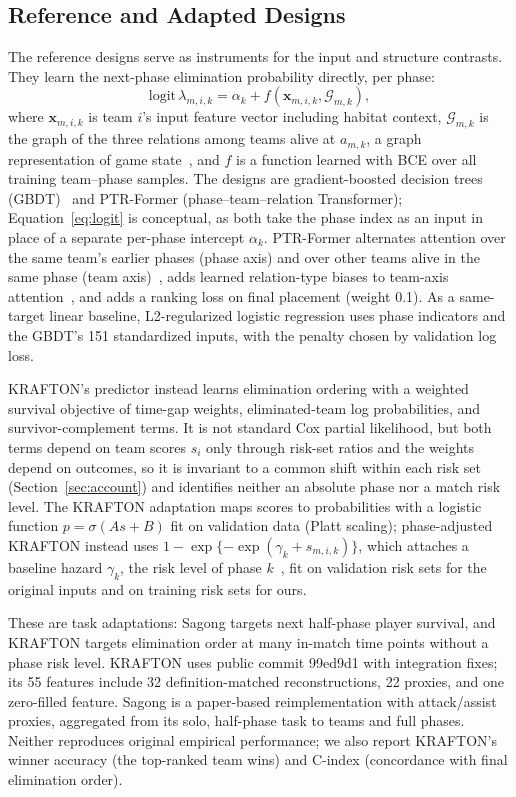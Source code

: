 \documentclass[sigconf,anonymous]{acmart}
\begin{document}
\subsection{Reference and Adapted Designs}
\label{sec:method:rq2}
The reference designs serve as instruments for the input and structure contrasts. They learn the next-phase elimination probability directly, per phase:
\begin{equation}
\mathrm{logit}\,\lambda_{m,i,k}=\alpha_k+f(\mathbf{x}_{m,i,k},\mathcal{G}_{m,k}),
\label{eq:logit}
\end{equation}
where $\mathbf{x}_{m,i,k}$ is team $i$'s input feature vector including habitat context, $\mathcal{G}_{m,k}$ is the graph of the three relations among teams alive at $a_{m,k}$, a graph representation of game state~\cite{Xenopoulos21}, and $f$ is a function learned with BCE over all training team--phase samples. The designs are gradient-boosted decision trees (GBDT)~\cite{Friedman01} and PTR-Former (phase--team--relation Transformer); Equation~\eqref{eq:logit} is conceptual, as both take the phase index as an input in place of a separate per-phase intercept $\alpha_k$. PTR-Former alternates attention over the same team's earlier phases (phase axis) and over other teams alive in the same phase (team axis)~\cite{Vaswani17,Ngiam22}, adds learned relation-type biases to team-axis attention~\cite{Ying21}, and adds a ranking loss on final placement (weight 0.1). As a same-target linear baseline, L2-regularized logistic regression uses phase indicators and the GBDT's 151 standardized inputs, with the penalty chosen by validation log loss.

KRAFTON's predictor instead learns elimination ordering with a weighted survival objective of time-gap weights, eliminated-team log probabilities, and survivor-complement terms. It is not standard Cox partial likelihood, but both terms depend on team scores $s_i$ only through risk-set ratios and the weights depend on outcomes, so it is invariant to a common shift within each risk set (Section~\ref{sec:account}) and identifies neither an absolute phase nor a match risk level. The KRAFTON adaptation maps scores to probabilities with a logistic function $p=\sigma(A s+B)$ fit on validation data (Platt scaling); phase-adjusted KRAFTON instead uses $1-\exp\{-\exp(\gamma_k+s_{m,i,k})\}$, which attaches a baseline hazard $\gamma_k$, the risk level of phase $k$~\cite{PrenticeGloeckler78}, fit on validation risk sets for the original inputs and on training risk sets for ours.

These are task adaptations: Sagong targets next half-phase player survival, and KRAFTON targets elimination order at many in-match time points without a phase risk level. KRAFTON uses public commit 99ed9d1 with integration fixes; its 55 features include 32 definition-matched reconstructions, 22 proxies, and one zero-filled feature. Sagong is a paper-based reimplementation with attack/assist proxies, aggregated from its solo, half-phase task to teams and full phases. Neither reproduces original empirical performance; we also report KRAFTON's winner accuracy (the top-ranked team wins) and C-index (concordance with final elimination order).
\end{document}
